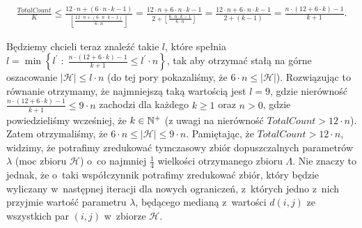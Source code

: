 \begin{gather*}
	\frac{TotalCount}{K} \leqslant \frac{12 \cdot n + \left( 6 \cdot n \cdot k - 1 \right)}{\left\lfloor \frac{12 \cdot n + \left( 6 \cdot n \cdot k - 1 \right)}{6 \cdot n} \right\rfloor} = \frac{12 \cdot n + 6 \cdot n \cdot k - 1}{2 + \left\lfloor \frac{6 \cdot n \cdot k - 1}{6 \cdot n} \right\rfloor} = \frac{12 \cdot n + 6 \cdot n \cdot k - 1}{2 + \left( k - 1\right)} = \frac{n \cdot \left( 12 + 6 \cdot k \right) - 1}{k + 1}\text{.}
\end{gather*}

Będziemy chcieli teraz znaleźć takie $l$, które spełnia $l = \min \left\{ l^{\prime} \; : \; \frac{n \cdot \left( 12 + 6 \cdot k \right) - 1}{k + 1} \leqslant l^{\prime} \cdot n \right\}$, tak aby otrzymać stałą na górne oszacowanie $\left| \mathcal{H} \right| \leqslant l \cdot n$ (do tej pory pokazaliśmy, że $6 \cdot n \leqslant \left| \mathcal{H} \right|$).
Rozwiązując to równanie otrzymamy, że najmniejszą taką wartością jest $l = 9$, gdzie nierówność $\frac{n \cdot \left( 12 + 6 \cdot k \right) - 1}{k + 1} \leqslant 9 \cdot n$ zachodzi dla każdego $k \geqslant 1$ oraz $n > 0$, gdzie powiedzieliśmy wcześniej, że $k \in \mathbb{N}^{+}$ (z uwagi na nierówność $TotalCount > 12 \cdot n$).
Zatem otrzymaliśmy, że $6 \cdot n \leqslant \left| \mathcal{H} \right| \leqslant 9 \cdot n$.
Pamiętając, że $TotalCount > 12 \cdot n$, widzimy, że potrafimy zredukować tymczasowy zbiór dopuszczalnych parametrów $\lambda$ (moc zbioru $\mathcal{H}$) o~co najmniej $\frac{1}{4}$ wielkości otrzymanego zbioru $\Lambda$.
Nie znaczy to jednak, że o~taki współczynnik potrafimy zredukować zbiór, który będzie wyliczany w~następnej iteracji dla nowych ograniczeń, z~których jedno z~nich przyjmie wartość parametru $\lambda$, będącego medianą z~wartości $d \left( i, j \right)$ ze wszystkich par $\left( i, j \right)$ w~zbiorze $\mathcal{H}$.

